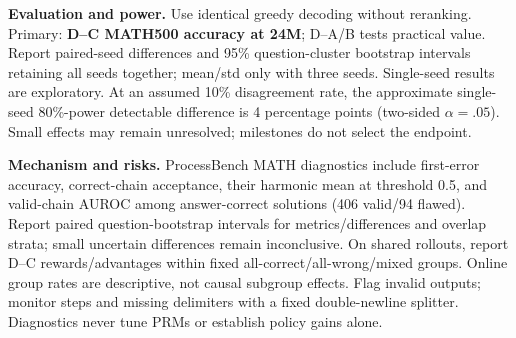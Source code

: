 \documentclass{article}
\begin{document}
\textbf{Evaluation and power.} Use identical greedy decoding without reranking. Primary: \textbf{D--C MATH500 accuracy at 24M}; D--A/B tests practical value. Report paired-seed differences and 95\% question-cluster bootstrap intervals retaining all seeds together; mean/std only with three seeds. Single-seed results are exploratory. At an assumed 10\% disagreement rate, the approximate single-seed 80\%-power detectable difference is 4 percentage points (two-sided $\alpha=.05$). Small effects may remain unresolved; milestones do not select the endpoint.

\textbf{Mechanism and risks.} ProcessBench MATH diagnostics include first-error accuracy, correct-chain acceptance, their harmonic mean at threshold 0.5, and valid-chain AUROC among answer-correct solutions (406 valid/94 flawed). Report paired question-bootstrap intervals for metrics/differences and overlap strata; small uncertain differences remain inconclusive. On shared rollouts, report D--C rewards/advantages within fixed all-correct/all-wrong/mixed groups. Online group rates are descriptive, not causal subgroup effects. Flag invalid outputs; monitor steps and missing delimiters with a fixed double-newline splitter. Diagnostics never tune PRMs or establish policy gains alone.
\end{document}
